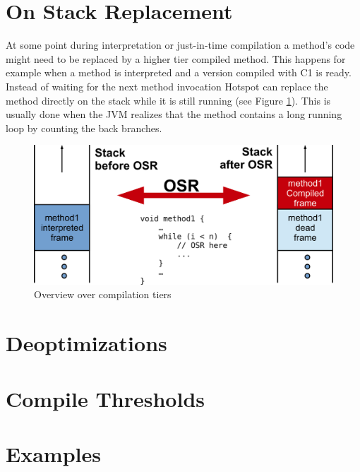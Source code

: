 \section{On Stack Replacement}
\label{sec:onstackreplacement}
At some point during interpretation or just-in-time compilation a method's code might need to be replaced by a higher tier compiled method. This happens for example when a method is interpreted and a version compiled with C1 is ready.
Instead of waiting for the next method invocation Hotspot can replace the method directly on the stack while it is still running (see Figure \ref{fig:osr}).
This is usually done when the JVM realizes that the method contains a long running loop by counting the back branches.
\begin{figure}[h]
  \begin{center}
    \centering
    \includegraphics{figures/osr.png}
    \caption{Overview over compilation tiers}
    \label{fig:osr}
  \end{center}
\end{figure}

\section{Deoptimizations}
\label{sec:deoptimizations}

\section{Compile Thresholds}
\label{sec:compilethresholds}

\section{Examples}
\label{sec:examples}
